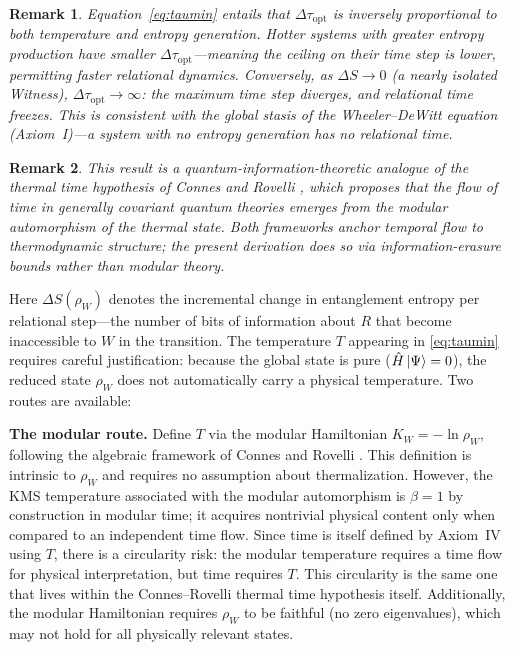 \documentclass[12pt, a4paper]{article}
\newtheorem{remark}{Remark}
\begin{document}
\begin{remark}
Equation~\eqref{eq:taumin} entails that $\Delta\tau_{\mathrm{opt}}$ is inversely proportional to both temperature and entropy generation. Hotter systems with greater entropy production have smaller $\Delta\tau_{\mathrm{opt}}$---meaning the ceiling on their time step is lower, permitting faster relational dynamics. Conversely, as $\Delta S \to 0$ (a nearly isolated Witness), $\Delta\tau_{\mathrm{opt}} \to \infty$: the maximum time step diverges, and relational time freezes. This is consistent with the global stasis of the Wheeler--DeWitt equation (Axiom~I)---a system with no entropy generation has no relational time.
\end{remark}

\begin{remark}
This result is a quantum-information-theoretic analogue of the thermal time hypothesis of Connes and Rovelli \cite{Connes1994}, which proposes that the flow of time in generally covariant quantum theories emerges from the modular automorphism of the thermal state. Both frameworks anchor temporal flow to thermodynamic structure; the present derivation does so via information-erasure bounds rather than modular theory.
\end{remark}

\noindent Here $\Delta S(\rho_W)$ denotes the incremental change in entanglement entropy per relational step---the number of bits of information about $R$ that become inaccessible to $W$ in the transition. The temperature $T$ appearing in \eqref{eq:taumin} requires careful justification: because the global state is pure ($\hat{H}\ket{\Psi} = 0$), the reduced state $\rho_W$ does not automatically carry a physical temperature. Two routes are available:

\medskip
\noindent\textbf{The modular route.} Define $T$ via the modular Hamiltonian $K_W = -\ln \rho_W$, following the algebraic framework of Connes and Rovelli \cite{Connes1994}. This definition is intrinsic to $\rho_W$ and requires no assumption about thermalization. However, the KMS temperature associated with the modular automorphism is $\beta = 1$ by construction in modular time; it acquires nontrivial physical content only when compared to an independent time flow. Since time is itself defined by Axiom~IV using $T$, there is a circularity risk: the modular temperature requires a time flow for physical interpretation, but time requires $T$. This circularity is the same one that lives within the Connes--Rovelli thermal time hypothesis itself. Additionally, the modular Hamiltonian requires $\rho_W$ to be faithful (no zero eigenvalues), which may not hold for all physically relevant states.
\end{document}
